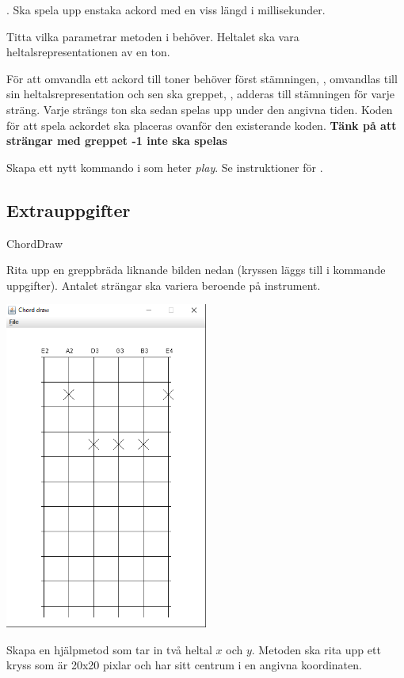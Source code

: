 {\Task {}. Ska spela upp enstaka ackord  med en viss längd  i millisekunder.

\Subtask Titta vilka parametrar metoden  i  behöver. Heltalet  ska vara heltalsrepresentationen av en ton.

\Subtask För att omvandla ett ackord till toner behöver först stämningen, , omvandlas till sin heltalsrepresentation och sen ska greppet, , adderas till stämningen för varje sträng. Varje strängs ton ska sedan spelas upp under den angivna tiden. Koden för att spela ackordet ska placeras ovanför den existerande koden. \textbf{Tänk på att strängar med greppet -1 inte ska spelas}

\Subtask Skapa ett nytt kommando i  som heter \textit{play}. Se instruktioner för .

\subsection{Extrauppgifter}

\Task ChordDraw

\Subtask Rita upp en greppbräda liknande bilden nedan (kryssen läggs till i kommande uppgifter). Antalet strängar ska variera beroende på instrument.

\includegraphics[width=0.5\textwidth]{../img/chords/ChordDraw}

\Subtask Skapa en hjälpmetod  som tar in två heltal $x$ och $y$. Metoden ska rita upp ett kryss som är 20x20 pixlar och har sitt centrum i en angivna koordinaten.

}
